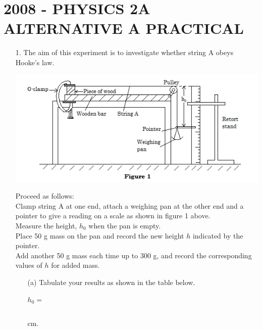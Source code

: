 \chapter{2008 - PHYSICS 2A  ALTERNATIVE A PRACTICAL}

\begin{enumerate}
\item[1.] The aim of this experiment is to investigate whether string A obeys Hooke's law.

\begin{center}
\includegraphics[width=15cm]{./img/2008-1-alt.png}
\end{center}

Proceed as follows:\\[6pt]

Clamp string A at one end, attach a weighing pan at the other end and a pointer to give a reading on a scale as shown in figure 1 above.\\[6pt]

Measure the height, $h_0$ when the pan is empty.\\[6pt]

Place 50 g mass on the pan and record the new height $h$ indicated by the pointer.\\[6pt]

Add another 50 g mass each time up to 300 g, and record the corresponding values of $h$ for added mass.

\begin{enumerate}
\item[(a)] Tabulate your results as shown in the table below.
\item[] $h_0 = $ \begin{tabular}{p{1.5cm}}
\\ \hline
\end{tabular} cm.\\[10pt]


\end{enumerate}
\end{enumerate}
